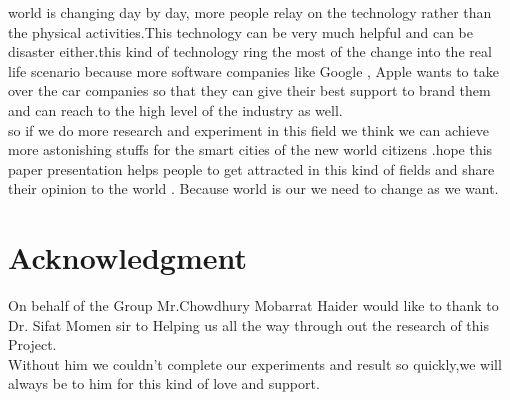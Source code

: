 \documentclass[conference]{IEEEtran}
\begin{document}
world is changing day by day, more people relay on the technology rather than the physical activities.This technology can be very much helpful and can be disaster either.this kind of technology ring the most of the change into the real life scenario because more software companies like Google , Apple wants to take over the car companies so that they can give their best support to brand them and can reach to the high level of the industry as well. \\
 so if we do more research and experiment in this field we think we can achieve more astonishing stuffs for the smart cities of the new world citizens .hope this paper presentation helps people to get attracted in this kind of fields and share their opinion to the world . Because world is our we need to change as we want.






%



\section*{Acknowledgment}


On behalf of the Group Mr.Chowdhury Mobarrat Haider would like to thank to Dr. Sifat Momen sir to Helping us all the way through out the research of this Project.\\
Without him we couldn't complete our experiments and result so quickly,we will always be  to him for this kind of love and support. 
\end{document}
